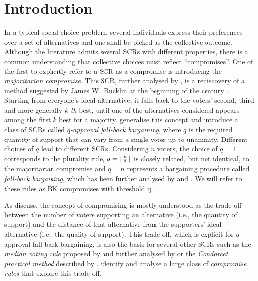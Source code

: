 \section{Introduction}
\label{sec:introduction}
In a typical social choice problem, several individuals express their preferences over a set of alternatives and one shall be picked as the collective outcome. Although the literature admits several \acp{SCR} with different properties, there is a common understanding that collective choices must reflect “compromises”. One of the first to explicitly refer to a \ac{SCR} as a compromise is \citet{Sertel1986} introducing the \emph{majoritarian compromise}. This \ac{SCR}, further analysed by \citet{Sertel1999}, is a rediscovery of a method suggested by James W.\ Bucklin at the beginning of the  century \citep{Erdelyi2015}. Starting from everyone’s ideal alternative, it falls back to the voters’ second, third and more generally $k$-\emph{th} best, until one of the alternatives considered appears among the first $k$ best for a majority. \citet{Brams2001} generalise this concept and introduce a class of \acp{SCR} called $q$\emph{-approval fall-back bargaining}, where $q$ is the required quantity of support that can vary from a single voter up to unanimity. Different choices of $q$ lead to different \acp{SCR}. Considering $n$ voters, the choice of $q=1$ corresponds to the plurality rule, $q=\lceil\frac{n}{2}\rceil$ is closely related, but not identical, to the majoritarian compromise and $q=n$ represents a bargaining procedure called \emph{fall-back bargaining}, which has been further analysed by \citet{Kibris2007} and \citet{Congar2012}. We will refer to these rules as \ac{BK} compromises with threshold q. 

As \citet{OezkalSanver2004} discuss, the concept of compromising is mostly understood as the trade off between the number of voters supporting an alternative (i.e., the quantity of support) and the distance of that alternative from the supporters’ ideal alternative (i.e., the quality of support). This trade off, which is explicit for $q$-approval fall-back bargaining, is also the basis for several other \acp{SCR} such as the \emph{median voting rule} proposed by \citet{Bassett1999} and further analysed by \citet{Gehrlein2003} or the \emph{Condorcet practical method} described by \citet{Nurmi1999}.  identify and analyse a large class of \emph{compromise rules} that explore this trade off.

